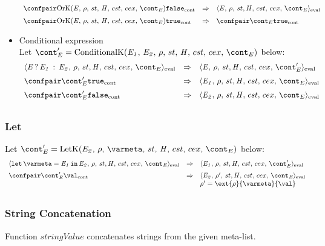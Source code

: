 \documentclass{article}
\begin{document}
\begin{itemize}
\[\begin{array}{lcl}
	\cesktrans{
		\contconf{\OrK{\expressionmeta}{\env}{\strace}{\cstrace}{\cex}{\econt}}{\false}}{
		\evalconf{\expressionmeta}{\env}{\strace}{\cstrace}{\cex}{\econt}}
		\\[2mm]

	\cesktrans{
		\contconf{\OrK{\expressionmeta}{\env}{\strace}{\cstrace}{\cex}{\econt}}{\true}}{
		\contconf{\econt}{\true}}
  \end{array}
\]
\item Conditional expression\\
Let $\econt' = \ConditionalK{\expri{1}}{\expri{2}}{\env}{\strace}{\cstrace}{\cex}{\econt}$ below:
\[
  \begin{array}{lcl}
	\cesktrans{
		\evalconf{\ConditionalExpression{\expr}{\expri{1}}{\expri{2}}}{\env}{\strace}{\cstrace}{\cex}{\econt}}{
		\evalconf{\expr}{\env}{\strace}{\cstrace}{\cex}{\econt'}}
		\\[2mm]

	\cesktrans{
		\contconf{\econt'}{\true}}{
		\evalconf{\expri{1}}{\env}{\strace}{\cstrace}{\cex}{\econt}}
		\\[2mm]

	\cesktrans{
		\contconf{\econt'}{\false}}{
		\evalconf{\expri{2}}{\env}{\strace}{\cstrace}{\cex}{\econt}}
		\\[2mm]
  \end{array}
\]

\end{itemize}
\subsubsection{Let}
\newcommand{\letk}[7]{\mathrm{LetK}({#1},\,{#2},\,{#3},\,{#4},\,{\handler},\,{#5},\,{#6},\,{#7})}
Let $\econt' = \letk{\expri{2}}{\env}{\varmeta}{\strace}{\cstrace}{\cex}{\econt}$ below:
\[
  \begin{array}{lcl}
	\cesktrans{
		\evalconf{\Let{\varmeta}{\expri{1}}{\expri{2}}}{\env}{\strace}{\cstrace}{\cex}{\econt}}{
		\evalconf{\expri{1}}{\env}{\strace}{\cstrace}{\cex}{\econt'}}
		\\[2mm]

	\cesktrans{
		\contconf{\econt'}{\val}}{
		\evalconf{\expri{2}}{\env'}{\strace}{\cstrace}{\cex}{\econt}}
		\\
	&&\env'=\ext{\env}{\varmeta}{\val}\\[2mm]
  \end{array}
\]
\subsubsection{String Concatenation}
\label{subsubsec:string-concatenation}
Function $stringValue$ concatenates strings from the given meta-list.
\end{document}
